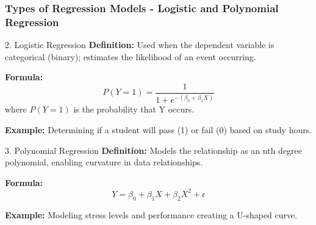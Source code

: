 \documentclass{beamer}
\begin{document}
\begin{frame}[fragile]
    \frametitle{Types of Regression Models - Logistic and Polynomial Regression}
    \begin{block}{2. Logistic Regression}
        \textbf{Definition:} Used when the dependent variable is categorical (binary); estimates the likelihood of an event occurring.
        
        \textbf{Formula:}
        \begin{equation}
        P(Y=1) = \frac{1}{1 + e^{-(\beta_0 + \beta_1 X)}}
        \end{equation}
        where \( P(Y=1) \) is the probability that Y occurs.
        
        \textbf{Example:} Determining if a student will pass (1) or fail (0) based on study hours.
    \end{block}
    
    \begin{block}{3. Polynomial Regression}
        \textbf{Definition:} Models the relationship as an nth degree polynomial, enabling curvature in data relationships.
        
        \textbf{Formula:}
        \begin{equation}
        Y = \beta_0 + \beta_1 X + \beta_2 X^2 + \epsilon
        \end{equation}
        
        \textbf{Example:} Modeling stress levels and performance creating a U-shaped curve.
    \end{block}
\end{frame}
\end{document}
